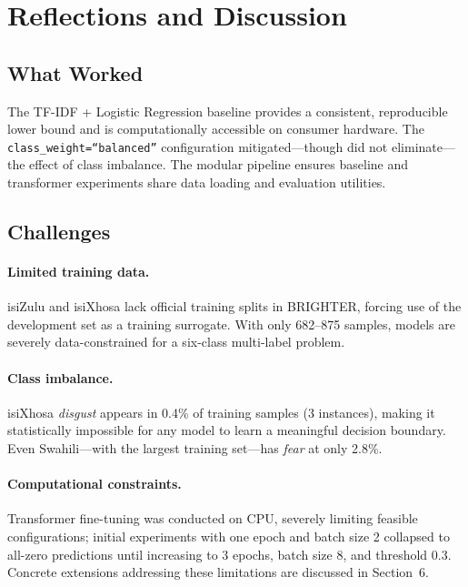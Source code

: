 \documentclass[11pt]{article}
\begin{document}
\section{Reflections and Discussion}

\subsection{What Worked}

The TF-IDF + Logistic Regression baseline provides a consistent,
reproducible lower bound and is computationally accessible on consumer
hardware.
The \texttt{class\_weight=``balanced''} configuration mitigated---though did
not eliminate---the effect of class imbalance.
The modular pipeline ensures baseline and transformer experiments share data loading and evaluation utilities.

\subsection{Challenges}

\paragraph{Limited training data.}
isiZulu and isiXhosa lack official training splits in BRIGHTER, forcing use
of the development set as a training surrogate.
With only 682--875 samples, models are severely data-constrained for a
six-class multi-label problem.

\paragraph{Class imbalance.}
isiXhosa \textit{disgust} appears in 0.4\% of training samples (3 instances),
making it statistically impossible for any model to learn a meaningful
decision boundary.
Even Swahili---with the largest training set---has \textit{fear} at only 2.8\%.

\paragraph{Computational constraints.}
Transformer fine-tuning was conducted on CPU, severely limiting feasible
configurations; initial experiments with one epoch and batch size 2 collapsed
to all-zero predictions until increasing to 3 epochs, batch size 8, and
threshold 0.3.
Concrete extensions addressing these limitations are discussed in Section~6.
\end{document}
